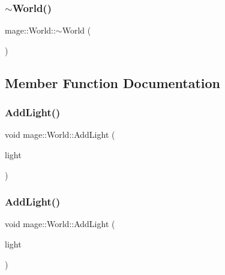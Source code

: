 \hypertarget{classmage_1_1_world_a8f594ba33a69c4142d599e548337bbcf}{}\label{classmage_1_1_world_a8f594ba33a69c4142d599e548337bbcf} 
\subsubsection{\texorpdfstring{$\sim$\+World()}{~World()}}
{\footnotesize\ttfamily mage\+::\+World\+::$\sim$\+World (\begin{DoxyParamCaption}{ }\end{DoxyParamCaption})}



\subsection{Member Function Documentation}
\hypertarget{classmage_1_1_world_aeccf98417c78fc59b9662d73a4d14baf}{}\label{classmage_1_1_world_aeccf98417c78fc59b9662d73a4d14baf} 
\subsubsection{\texorpdfstring{Add\+Light()}{AddLight()}\hspace{0.1cm}{\footnotesize\ttfamily [1/2]}}
{\footnotesize\ttfamily void mage\+::\+World\+::\+Add\+Light (\begin{DoxyParamCaption}\item[{\hyperlink{namespacemage_a1e01ae66713838a7a67d30e44c67703e}{Shared\+Ptr}$<$ \hyperlink{namespacemage_a5d71843ded3749108547eba2a5ce4d85}{Omni\+Light\+Node} $>$}]{light }\end{DoxyParamCaption})\hspace{0.3cm}{\ttfamily [private]}}

\hypertarget{classmage_1_1_world_a224000e03aded05bbb846d17a89a61a0}{}\label{classmage_1_1_world_a224000e03aded05bbb846d17a89a61a0} 
\subsubsection{\texorpdfstring{Add\+Light()}{AddLight()}\hspace{0.1cm}{\footnotesize\ttfamily [2/2]}}
{\footnotesize\ttfamily void mage\+::\+World\+::\+Add\+Light (\begin{DoxyParamCaption}\item[{\hyperlink{namespacemage_a1e01ae66713838a7a67d30e44c67703e}{Shared\+Ptr}$<$ \hyperlink{namespacemage_ab9f49a82dd438032bb38c5436a657335}{Spot\+Light\+Node} $>$}]{light }\end{DoxyParamCaption})\hspace{0.3cm}{\ttfamily [private]}}


